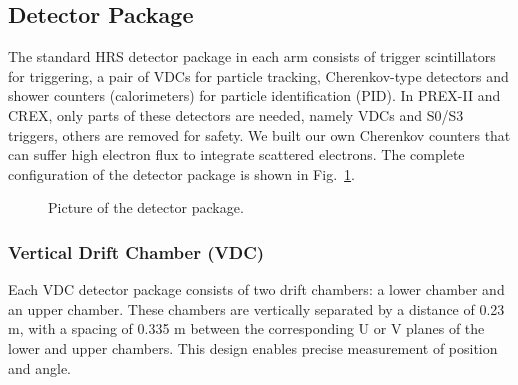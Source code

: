 \subsection{Detector Package}
The standard HRS detector package in each arm consists of trigger scintillators for
triggering, a pair of VDCs for particle tracking, Cherenkov-type detectors and
shower counters (calorimeters) for particle identification (PID). In PREX-II
and CREX, only parts of these detectors are needed, namely VDCs and S0/S3 triggers,
others are removed for safety. We built our own Cherenkov counters that can 
suffer high electron flux to integrate scattered electrons. The complete configuration
of the detector package is shown in Fig.~\ref{fig:detectors}.
\begin{figure}[!h]
    \centering
    \caption{Picture of the detector package.}
    \label{fig:detectors}
\end{figure}

\subsubsection{Vertical Drift Chamber (VDC)}
Each VDC detector package consists of two drift chambers: a lower chamber and an upper
chamber. These chambers are vertically separated by a distance of 0.23 m, with a spacing of 0.335 m between the corresponding U or V planes of the lower and upper chambers. This design enables precise measurement of position and angle.

